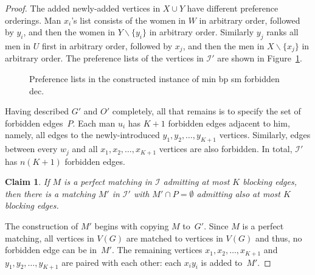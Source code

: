 \documentclass[preprint,12pt]{elsarticle}
\newtheorem{claim}[theorem]{Claim}
\begin{document}
\begin{proof}
The added newly-added vertices in $X\cup Y$ have different preference orderings. Man $x_i$'s list consists of the women in $W$ in arbitrary order, followed by $y_i$, and then the women in $Y\backslash \{y_i\}$ in arbitrary order.  Similarly $y_j$ ranks all men in $U$ first in arbitrary order, followed by $x_j$, and then the men in $X\backslash \{x_j\}$ in arbitrary order.  The preference lists of the vertices in $\mathcal I'$ are shown in Figure~\ref{fig:preflists}.

\begin{figure}[h]
\begin{center}
\end{center}
\caption{Preference lists in the constructed instance of {\sc min bp sm forbidden dec}.}
\label{fig:preflists}
\end{figure}

Having described $G'$ and $O'$ completely, all that remains is to specify the set of forbidden edges~$P$. Each man $u_i$ has $K+1$ forbidden edges adjacent to him, namely, all edges to the newly-introduced $y_1,y_2,\dots,y_{K+1}$ vertices. Similarly, edges between every $w_j$ and all $x_1,x_2,\dots,x_{K+1}$ vertices are also forbidden. In total, $\mathcal{I'}$ has $n(K+1)$ forbidden edges.
	
\begin{claim}
If $M$ is a perfect matching in $\mathcal{I}$ admitting at most $K$ blocking edges, then there is a matching $M'$ in $\mathcal{I'}$ with $M' \cap P = \emptyset$ admitting also at most $K$ blocking edges.
	\end{claim}
	
		The construction of $M'$ begins with copying $M$ to~$G'$. Since $M$ is a perfect matching, all vertices in $V(G)$ are matched to vertices in $V(G)$ and thus, no forbidden edge can be in~$M'$. The remaining vertices $x_1,x_2,\dots,x_{K+1}$ and $y_1,y_2,\dots,y_{K+1}$ are paired with each other: each $x_iy_i$ is added to~$M'$.
		

\end{proof}
\end{document}
